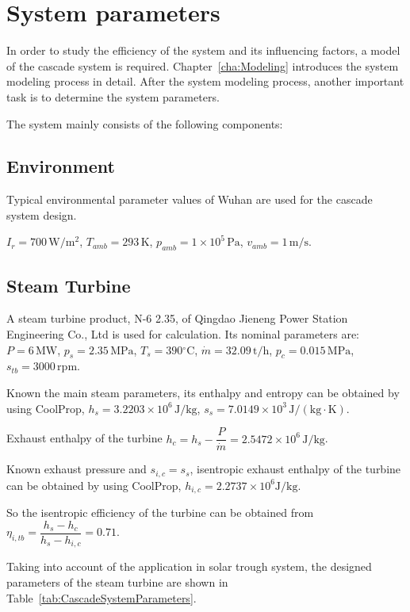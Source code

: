 \section{System parameters}

In order to study the efficiency of the system and its influencing factors, a model of the cascade system is required. Chapter~\ref{cha:Modeling} introduces the system modeling process in detail. After the system modeling process, another important task is to determine the system parameters.

The system mainly consists of the following components:

\subsection{Environment}

Typical environmental parameter values of Wuhan are used for the cascade system design.

$I_r = 700\,\mathrm{W/m^2}$, $T_{amb} = 293\,\mathrm{K}$, $p_{amb} = 1\times10^5\,\mathrm{Pa}$, $v_{amb} = 1\,\mathrm{m/s}$.

\subsection{Steam Turbine} 
	
A steam turbine product, N-6 2.35, of Qingdao Jieneng Power Station Engineering Co., Ltd is used for calculation. Its nominal parameters are: $P = 6\,\mathrm{MW}$, 	$p_s = 2.35\,\mathrm{MPa}$, $T_s = 390\mathrm{^\circ C}$, $\dot{m} = 32.09\,\mathrm{t/h}$, $p_c = 0.015\,\mathrm{MPa}$, $s_{tb} = 3000\,\mathrm{rpm}$.
	
	Known the main steam parameters, its enthalpy and entropy can be obtained by using CoolProp, $h_s = 3.2203\times10^6\,\mathrm{J/kg}$, $s_s = 7.0149\times10^3\,\mathrm{J/(kg\cdot K)}$.
	
	Exhaust enthalpy of the turbine $h_{c} = h_{s} - \dfrac{P}{\dot{m}} = 2.5472\times10^6\,\mathrm{J/kg}$.
	
	Known exhaust pressure and $s_{i,c} = s_s$, isentropic exhaust enthalpy of the turbine can be obtained by using CoolProp, $h_{i,c} = 2.2737\times10^6\mathrm{J/kg}$.	
	
	So the isentropic efficiency of the turbine can be obtained from
	$\eta_{i,tb} = \dfrac{h_s - h_c}{h_{s} - h_{i,c}} = 0.71$.
	
	Taking into account of the application in solar trough system, the designed parameters of the steam turbine are shown in Table~\ref{tab:CascadeSystemParameters}.
		 
